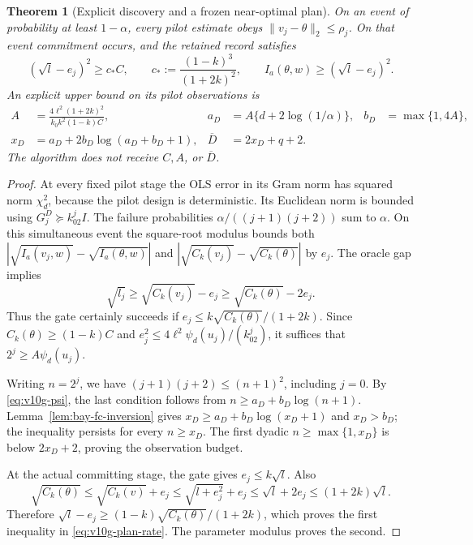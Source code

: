 \documentclass{article}
\theoremstyle{plain}
\newtheorem{theorem}{Theorem}[section]
\theoremstyle{definition}
\begin{document}
\begin{theorem}[Explicit discovery and a frozen near-optimal plan]
\label{thm:v10g-discovery}
On an event of probability at least $1-\alpha$, every pilot estimate
obeys $\|v_j-\theta\|_2\le\rho_j$.  On that event commitment occurs,
and the retained record satisfies
\begin{equation}
 (\sqrt l-e_j)^2\ge c_*C,
 \qquad c_*:=\frac{(1-k)^3}{(1+2k)^2},
 \qquad I_a(\theta,w)\ge(\sqrt l-e_j)^2.
 \label{eq:v10g-plan-rate}
\end{equation}
An explicit upper bound on its pilot observations is
\begin{align}
 A&=\frac{4\ell^2(1+2k)^2}{k_0k^2(1-k)C},
 &a_D&=A\{d+2\log(1/\alpha)\},
 &b_D&=\max\{1,4A\},\nonumber\\
 x_D&=a_D+2b_D\log(a_D+b_D+1),
 &\overline D&=2x_D+q+2.
 \label{eq:v10g-discovery-budget}
\end{align}
The algorithm does not receive $C,A$, or $\overline D$.
\end{theorem}
\begin{proof}
At every fixed pilot stage the OLS error in its Gram norm has squared
norm $\chi_d^2$, because the pilot design is deterministic.  Its
Euclidean norm is bounded using $G_j^D\succeq k_02^jI$.
The failure probabilities $\alpha/((j+1)(j+2))$ sum to $\alpha$.
On this simultaneous event the square-root modulus bounds
both $|\sqrt{I_a(v_j,w)}-\sqrt{I_a(\theta,w)}|$ and
$|\sqrt{C_k(v_j)}-\sqrt{C_k(\theta)}|$ by $e_j$.
The oracle gap implies
\[
 \sqrt{l_j}\ge\sqrt{C_k(v_j)}-e_j
                \ge\sqrt{C_k(\theta)}-2e_j.
\]
Thus the gate certainly succeeds if
$e_j\le k\sqrt{C_k(\theta)}/(1+2k)$.
Since $C_k(\theta)\ge(1-k)C$ and
$e_j^2\le4\ell^2\psi_d(u_j)/(k_02^j)$, it suffices that
$2^j\ge A\psi_d(u_j)$.

Writing $n=2^j$, we have $(j+1)(j+2)\le(n+1)^2$, including $j=0$.
By \eqref{eq:v10g-psi}, the last condition follows from
$n\ge a_D+b_D\log(n+1)$.
Lemma~\ref{lem:bay-fc-inversion} gives
$x_D\ge a_D+b_D\log(x_D+1)$ and $x_D>b_D$;
the inequality persists for every $n\ge x_D$.
The first dyadic $n\ge\max\{1,x_D\}$ is below $2x_D+2$,
proving the observation budget.

At the actual committing stage, the gate gives $e_j\le k\sqrt l$.
Also
\[
 \sqrt{C_k(\theta)}
 \le\sqrt{C_k(v)}+e_j
 \le\sqrt{l+e_j^2}+e_j
 \le\sqrt l+2e_j\le(1+2k)\sqrt l.
\]
Therefore $\sqrt l-e_j\ge(1-k)\sqrt{C_k(\theta)}/(1+2k)$,
which proves the first inequality in \eqref{eq:v10g-plan-rate}.
The parameter modulus proves the second.
\end{proof}
\end{document}
